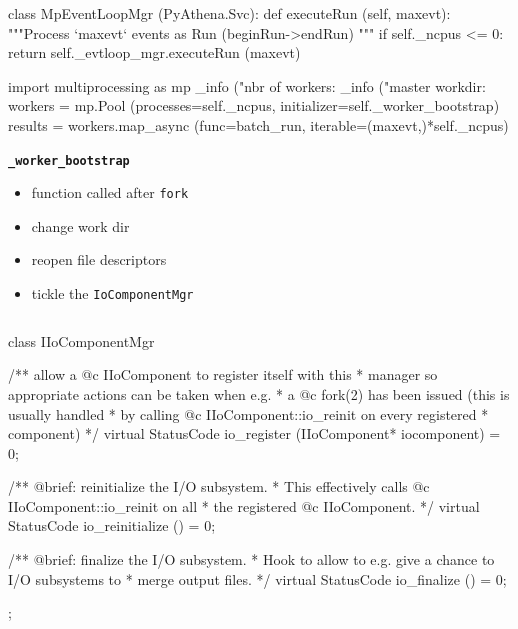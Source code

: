 \documentclass[9pt]{beamer}
\newcommand{\myred}  [1] {{\color{red}#1}}
\begin{document}
\begin{frame}[fragile]{}

  \begin{columns}
    \begin{column}{0.95\textwidth}

\begin{python}
class MpEventLoopMgr (PyAthena.Svc):
    def executeRun (self, maxevt):
        """Process `maxevt` events as Run (beginRun->endRun)
        """
        if self._ncpus <= 0:
            return self._evtloop_mgr.executeRun (maxevt)

        import multiprocessing as mp
        _info ("nbr of workers: %
        _info ("master workdir: %
        workers = mp.Pool (processes=self._ncpus,
                           initializer=self._worker_bootstrap)
        results = workers.map_async (func=batch_run,
                                     iterable=(maxevt,)*self._ncpus)
\end{python}

\begin{exampleblock}{\bf{\myred{\texttt{\_worker\_bootstrap}}}}
\begin{itemize}
  \item function called after \texttt{fork}
  \item change work dir
  \item reopen file descriptors
  \item tickle the \texttt{IoComponentMgr}
\end{itemize}
\end{exampleblock}
    \end{column}
  \end{columns}
\end{frame}

\begin{frame}[fragile]{}

  \begin{columns}
    \begin{column}{0.95\textwidth}

\begin{C++}
class IIoComponentMgr 
{
  /** allow a @c IIoComponent to register itself with this
   *  manager so appropriate actions can be taken when e.g.
   *  a @c fork(2) has been issued (this is usually handled
   *  by calling @c IIoComponent::io_reinit on every registered
   *  component)
   */
  virtual
  StatusCode io_register (IIoComponent* iocomponent) = 0;
  
  /** @brief: reinitialize the I/O subsystem.
   *  This effectively calls @c IIoComponent::io_reinit on all 
   *  the registered @c IIoComponent.
   */
  virtual
  StatusCode io_reinitialize () = 0;

  /** @brief: finalize the I/O subsystem.
   *  Hook to allow to e.g. give a chance to I/O subsystems to 
   *  merge output files.
   */
  virtual
  StatusCode io_finalize () = 0;
};
\end{C++}

    \end{column}
  \end{columns}
\end{frame}
\end{document}
